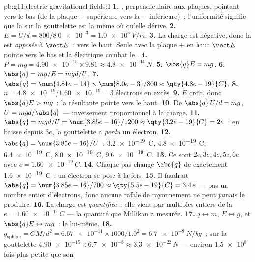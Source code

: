 \begin{solution}{pb:g11:electric-gravitational-fields:1}
\textbf{1.} ,
perpendiculaire aux plaques, pointant vers le bas (de la plaque $+$
supérieure vers la $-$ inférieure)~; l'uniformité signifie que la
 sur la gouttelette est la même où
qu'elle dérive.
\textbf{2.} $E = U/d = 800 / \num{8.0e-3} = \qty{1.0e5}{V/m}$.
\textbf{3.} La charge est négative, donc la
 est \emph{opposée} à $\vect E$~:
vers le haut. Seule avec la plaque $+$ en haut $\vect E$ pointe vers le
bas et la  électrique combat le
.
\textbf{4.} $P = mg = \num{4.90e-15} \times 9.81 \approx
\qty{4.8e-14}{N}$.
\textbf{5.} $\abs{q}E = mg$.
\textbf{6.} $\abs{q} = mg/E = mgd/U$.
\textbf{7.} $\abs{q} = \num{4.81e-14} \times \num{8.0e-3} / 800
\approx \qty{4.8e-19}{C}$.
\textbf{8.} $n = \num{4.8e-19} / \num{1.60e-19} = 3$ électrons en
excès.
\textbf{9.} $E$ croît, donc $\abs{q}E > mg$~: la
 résultante pointe vers le haut.
\textbf{10.} De $\abs{q}\,U/d = mg$, $U = mgd/\abs{q}$ ---
inversement proportionnel à la charge.
\textbf{11.} $\abs{q} = mgd/U = \num{3.85e-16}/1200 \approx
\qty{3.2e-19}{C} = 2e$~: en baisse depuis $3e$, la gouttelette a
\emph{perdu} un électron.
\textbf{12.} $\abs{q} = \num{3.85e-16}/U$~: \qty{3.2e-19}{C},
\qty{4.8e-19}{C}, \qty{6.4e-19}{C}, \qty{8.0e-19}{C},
\qty{9.6e-19}{C}.
\textbf{13.} Ce sont $2e, 3e, 4e, 5e, 6e$ avec
$e = \qty{1.60e-19}{C}$.
\textbf{14.} Chaque pas change $\abs{q}$ de exactement
\qty{1.6e-19}{C}~: un électron se pose à la fois.
\textbf{15.} Il faudrait $\abs{q} = \num{3.85e-16}/700 \approx
\qty{5.5e-19}{C} = 3.4\,e$ --- pas un nombre entier d'électrons, donc
aucune rafale de rayonnement ne peut jamais le produire.
\textbf{16.} La charge est \emph{quantifiée}~: elle vient par multiples
entiers de la  $e = \qty{1.60e-19}{C}$ --- la quantité que Millikan a
mesurée.
\textbf{17.} $q \leftrightarrow m$, $E \leftrightarrow g$, et
$\abs{q}E \leftrightarrow mg$~: le
 lui-même.
\textbf{18.} $g_{\text{sphère}} = GM/d^2 = \num{6.67e-11} \times 1000 /
1.0^2 = \qty{6.7e-8}{N/kg}$~;  sur la
gouttelette $\num{4.90e-15} \times \num{6.7e-8} \approx
\qty{3.3e-22}{N}$ --- environ $\num{1.5e8}$ fois plus petite que son

\end{solution}

